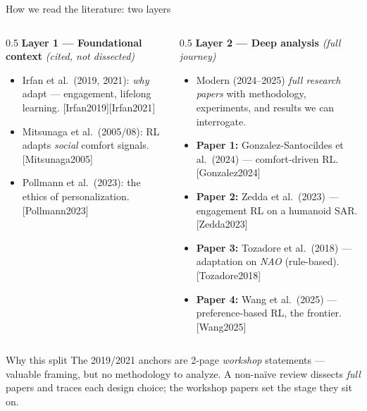 \documentclass[aspectratio=169,10pt]{beamer}
\newcommand{\refnum}[1]{{\footnotesize\color{giuaccent}[#1]}}
\begin{document}
\begin{frame}{How we read the literature: two layers}
  \begin{columns}[T]
    \begin{column}{0.5\textwidth}
      \textbf{Layer 1 --- Foundational context} \emph{(cited, not dissected)}
      \begin{itemize}\footnotesize
        \item Irfan et al.\ (2019, 2021): \emph{why} adapt --- engagement, lifelong learning. \refnum{Irfan2019}\refnum{Irfan2021}
        \item Mitsunaga et al.\ (2005/08): RL adapts \emph{social} comfort signals. \refnum{Mitsunaga2005}
        \item Pollmann et al.\ (2023): the ethics of personalization. \refnum{Pollmann2023}
      \end{itemize}
    \end{column}
    \begin{column}{0.5\textwidth}
      \textbf{Layer 2 --- Deep analysis} \emph{(full journey)}
      \begin{itemize}\footnotesize
        \item Modern (2024--2025) \emph{full research papers} with methodology, experiments, and results we can interrogate.
        \item \textbf{Paper 1:} Gonzalez-Santocildes et al.\ (2024) --- comfort-driven RL. \refnum{Gonzalez2024}
        \item \textbf{Paper 2:} Zedda et al.\ (2023) --- engagement RL on a humanoid SAR. \refnum{Zedda2023}
        \item \textbf{Paper 3:} Tozadore et al.\ (2018) --- adaptation on \emph{NAO} (rule-based). \refnum{Tozadore2018}
        \item \textbf{Paper 4:} Wang et al.\ (2025) --- preference-based RL, the frontier. \refnum{Wang2025}
      \end{itemize}
    \end{column}
  \end{columns}
  \vspace{0.6em}
  \begin{block}{Why this split}
    \footnotesize The 2019/2021 anchors are 2-page \emph{workshop} statements --- valuable framing, but no methodology to analyze. A non-naïve review dissects \emph{full} papers and traces each design choice; the workshop papers set the stage they sit on.
  \end{block}
\end{frame}
\end{document}
